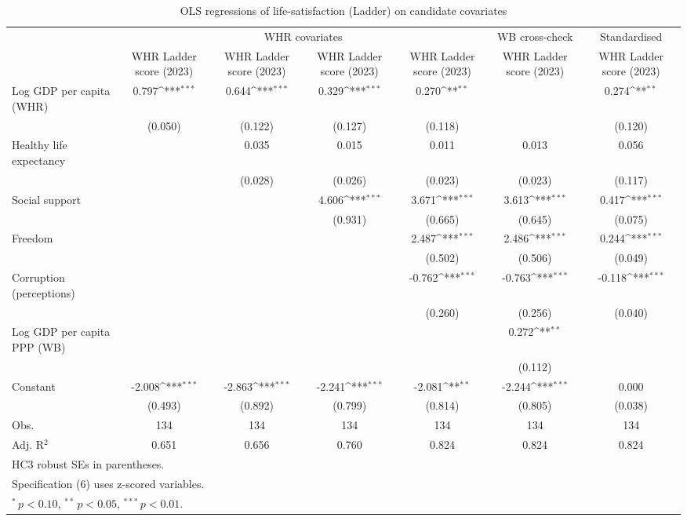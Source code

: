 \begin{table}[]
\caption{OLS regressions of life-satisfaction (Ladder) on candidate covariates}
\label{tab:ols}
{
\def\sym#1{\ifmmode^{#1}\else\(^{#1}\)\fi}
\begin{tabular}{@{\extracolsep{2pt}}l*{6}{c}@{}}
\hline\hline
& \multicolumn{4}{c}{WHR covariates} & \multicolumn{1}{c}{WB cross-check} & \multicolumn{1}{c}{Standardised} \\
\cline{2-5}
\cline{6-6}
\cline{7-7}
 & WHR Ladder score (2023) & WHR Ladder score (2023) & WHR Ladder score (2023) & WHR Ladder score (2023) & WHR Ladder score (2023) & WHR Ladder score (2023) \\
\hline
Log GDP per capita (WHR) & 0.797\sym{***} & 0.644\sym{***} & 0.329\sym{***} & 0.270\sym{**} &  & 0.274\sym{**} \\
 & (0.050) & (0.122) & (0.127) & (0.118) &  & (0.120) \\
Healthy life expectancy &  & 0.035 & 0.015 & 0.011 & 0.013 & 0.056 \\
 &  & (0.028) & (0.026) & (0.023) & (0.023) & (0.117) \\
Social support &  &  & 4.606\sym{***} & 3.671\sym{***} & 3.613\sym{***} & 0.417\sym{***} \\
 &  &  & (0.931) & (0.665) & (0.645) & (0.075) \\
Freedom &  &  &  & 2.487\sym{***} & 2.486\sym{***} & 0.244\sym{***} \\
 &  &  &  & (0.502) & (0.506) & (0.049) \\
Corruption (perceptions) &  &  &  & -0.762\sym{***} & -0.763\sym{***} & -0.118\sym{***} \\
 &  &  &  & (0.260) & (0.256) & (0.040) \\
Log GDP per capita PPP (WB) &  &  &  &  & 0.272\sym{**} &  \\
 &  &  &  &  & (0.112) &  \\
Constant & -2.008\sym{***} & -2.863\sym{***} & -2.241\sym{***} & -2.081\sym{**} & -2.244\sym{***} & 0.000 \\
 & (0.493) & (0.892) & (0.799) & (0.814) & (0.805) & (0.038) \\

\hline
Obs. & 134 & 134 & 134 & 134 & 134 & 134 \\
Adj. R$^2$ & 0.651 & 0.656 & 0.760 & 0.824 & 0.824 & 0.824 \\
\hline\hline
\multicolumn{7}{l}{\footnotesize HC3 robust SEs in parentheses.}\vspace{-.25em} \\
\multicolumn{7}{l}{\footnotesize Specification (6) uses z-scored variables.}\vspace{-.25em} \\
\multicolumn{7}{l}{\footnotesize $^*\,p<0.10$, $^{**}\,p<0.05$, $^{***}\,p<0.01$.}
\end{tabular}
}
\end{table}